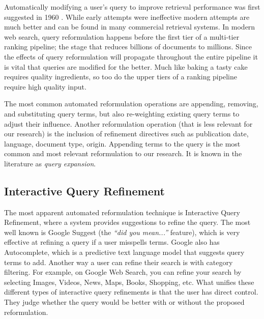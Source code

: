 Automatically modifying a user's query to improve retrieval performance was first suggested in 1960 \cite{maron1960relevance}. While early attempts were ineffective modern attempts are much better and can be found in many commercial retrieval systems. In modern web search, query reformulation happens before the first tier of a multi-tier ranking pipeline; the stage that reduces billions of documents to millions. Since the effects of query reformulation will propagate throughout the entire pipeline it is vital that queries are modified for the better. Much like baking a tasty cake requires quality ingredients, so too do the upper tiers of a ranking pipeline require high quality input.

The most common automated reformulation operations are appending, removing, and substituting query terms, but also re-weighting existing query terms to adjust their influence. Another reformulation operation (that is less relevant for our research) is the inclusion of refinement directives such as publication date, language, document type, origin. Appending terms to the query is the most common and most relevant reformulation to our research. It is known in the literature as \textit{query expansion}.



\subsection{Interactive Query Refinement}
The most apparent automated reformulation technique is Interactive Query Refinement, where a system provides suggestions to refine the query. The most well known is Google Suggest (the \textit{``did you mean...''} feature), which is very effective at refining a query if a user misspells terms. Google also has Autocomplete, which is a predictive text language model that suggests query terms to add. Another way a user can refine their search is with category filtering. For example, on Google Web Search, you can refine your search by selecting Images, Videos, News, Maps, Books, Shopping, etc. What unifies these different types of interactive query refinements is that the user has direct control. They judge whether the query would be better with or without the proposed reformulation.   



